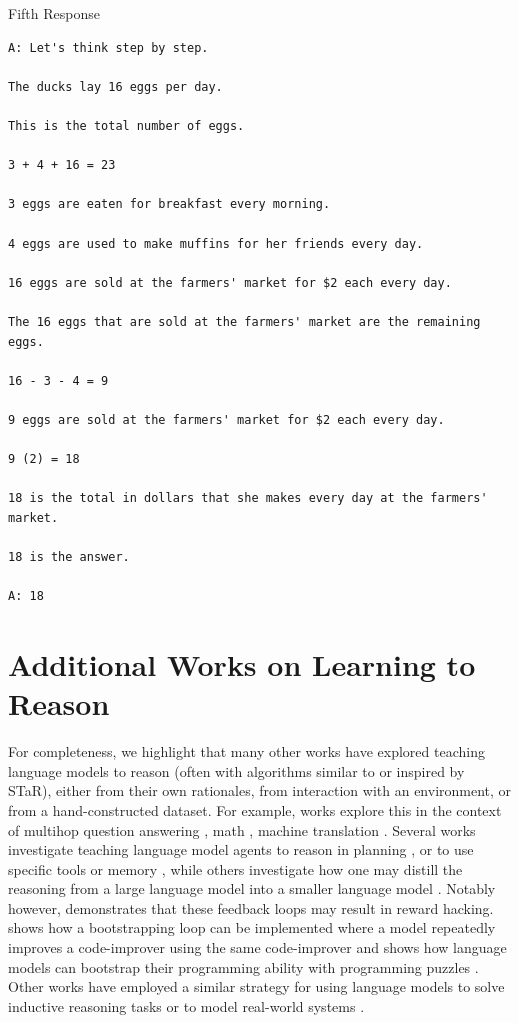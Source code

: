 \documentclass{article} %
\begin{document}
\vspace{10px}
Fifth Response
\begin{lstlisting}
A: Let's think step by step.

The ducks lay 16 eggs per day.

This is the total number of eggs.

3 + 4 + 16 = 23

3 eggs are eaten for breakfast every morning.

4 eggs are used to make muffins for her friends every day.

16 eggs are sold at the farmers' market for $2 each every day.

The 16 eggs that are sold at the farmers' market are the remaining eggs.

16 - 3 - 4 = 9

9 eggs are sold at the farmers' market for $2 each every day.

9 (2) = 18

18 is the total in dollars that she makes every day at the farmers' market.

18 is the answer.

A: 18
\end{lstlisting}

\section{Additional Works on Learning to Reason}
\label{app:otherreasoning}
For completeness, we highlight that many other works have explored teaching language models to reason (often with algorithms similar to or inspired by STaR), either from their own rationales, from interaction with an environment, or from a hand-constructed dataset. For example, works explore this in the context of multihop question answering \citep{zhao2023hop}, math \citep{luo2023wizardmath,uesato2022solving}, machine translation \citep{gulcehre2023reinforced}. Several works investigate teaching language model agents to reason in planning \citep{chen2023fireact,gandhi2023strategic,qiao2024autoact}, or to use specific tools or memory \citep{yao2022react,lanchantin2024learning,schick2024toolformer}, while others investigate how one may distill the reasoning from a large language model into a smaller language model \citet{ho2022large,li2022explanations,hsieh2023distilling}. Notably however, \citet{pan2024feedback} demonstrates that these feedback loops may result in reward hacking. \citet{zelikman2023self} shows how a bootstrapping loop can be implemented where a model repeatedly improves a code-improver using the same code-improver and \citet{haluptzok2023language} shows how language models can bootstrap their programming ability with programming puzzles \citet{schuster_programming_2021}. Other works have employed a similar strategy for using language models to solve inductive reasoning tasks or to model real-world systems \citep{wang2023hypothesis,qiu2023phenomenal,zhu2023large,li2024automated}.
\end{document}
